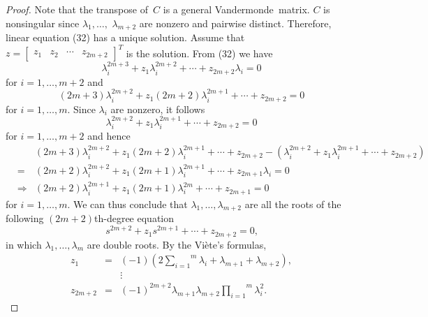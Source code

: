\documentclass[journal,a4paper,12pt,onecolumn]{IEEEtran}
\begin{document}
\begin{proof}
Note that the transpose of\textit{\ }$C$ is a general Vandermonde\textit{\ }matrix. $C$ is nonsingular since $\lambda _{1},\ldots ,$ $\lambda _{m+2}$
are nonzero and pairwise distinct. Therefore, linear equation (32) has a
unique solution. Assume that $z=\left[
\begin{array}{cccc}
z_{1} & z_{2} & \cdots & z_{2m+2}\end{array}\right] ^{T}$ is the solution. From (32) we have\begin{equation*}
\lambda _{i}^{2m+3}+z_{1}\lambda _{i}^{2m+2}+\cdots +z_{2m+2}\lambda _{i}=0
\end{equation*}for $i=1,\ldots ,m+2$ and\begin{equation*}
\left( 2m+3\right) \lambda _{i}^{2m+2}+z_{1}\left( 2m+2\right) \lambda
_{i}^{2m+1}+\cdots +z_{2m+2}=0
\end{equation*}for $i=1,\ldots ,m$. Since $\lambda _{i}$ are nonzero, it follows\begin{equation*}
\lambda _{i}^{2m+2}+z_{1}\lambda _{i}^{2m+1}+\cdots +z_{2m+2}=0
\end{equation*}for $i=1,\ldots ,m+2$ and hence\begin{eqnarray*}
&&\left( 2m+3\right) \lambda _{i}^{2m+2}+z_{1}\left( 2m+2\right) \lambda
_{i}^{2m+1}+\cdots +z_{2m+2}-\left( \lambda _{i}^{2m+2}+z_{1}\lambda
_{i}^{2m+1}+\cdots +z_{2m+2}\right) \\
&=&\left( 2m+2\right) \lambda _{i}^{2m+2}+z_{1}\left( 2m+1\right) \lambda
_{i}^{2m+1}+\cdots +z_{2m+1}\lambda _{i}=0 \\
&\Rightarrow &\left( 2m+2\right) \lambda _{i}^{2m+1}+z_{1}\left( 2m+1\right)
\lambda _{i}^{2m}+\cdots +z_{2m+1}=0
\end{eqnarray*}for $i=1,\ldots ,m$. We can thus conclude that $\lambda _{1},\ldots ,\lambda
_{m+2}$ are all the roots of the following $\left( 2m+2\right) $th-degree
equation\begin{equation*}
s^{2m+2}+z_{1}s^{2m+1}+\cdots +z_{2m+2}=0\text{,}
\end{equation*}in which $\lambda _{1},\ldots ,\lambda _{m}$ are double roots. By the Vi\`{e}te's formulas,\begin{eqnarray*}
z_{1} &=&\left( -1\right) \left( 2\overset{m}{\underset{i=1}{\sum }}\lambda
_{i}+\lambda _{m+1}+\lambda _{m+2}\right) , \\
&&\vdots \\
z_{2m+2} &=&\left( -1\right) ^{2m+2}\lambda _{m+1}\lambda _{m+2}\overset{m}{\underset{i=1}{\prod }}\lambda _{i}^{2}.
\end{eqnarray*}
\end{proof}
\end{document}
